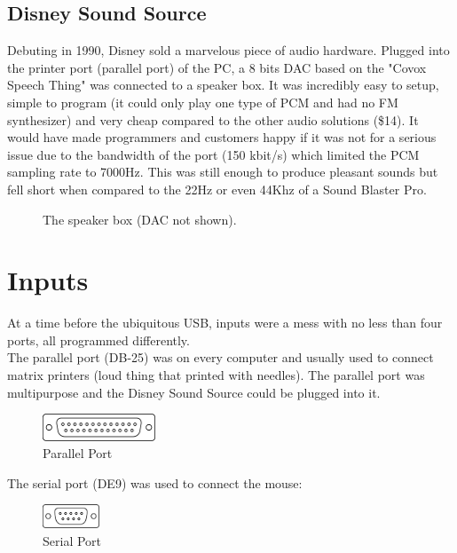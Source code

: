 \documentclass[book.tex]{subfiles}
\begin{document}
  \subsection{Disney Sound Source}
  Debuting in 1990, Disney sold a marvelous piece of audio hardware. Plugged into the printer port (parallel port) of the PC, a 8 bits DAC based on the "Covox Speech Thing" was connected to a speaker box. It was incredibly easy to setup, simple to program (it could only play one type of PCM and had no FM synthesizer) and very cheap compared to the other audio solutions (\$14). It would have made programmers and customers happy if it was not for a serious issue due to the bandwidth of the port (150 kbit/s) which limited the PCM sampling rate to 7000Hz.  This was still enough to produce pleasant sounds but fell short when compared to the 22Hz or even 44Khz of a Sound Blaster Pro.
  \par
  \begin{figure}[H] 
    \centering 
    \caption{The speaker box (DAC not shown).}
  \end{figure}








\section{Inputs}
At a time before the ubiquitous USB, inputs were a mess with no less than four ports, all programmed differently.\\

The parallel port (DB-25) was on every computer and usually used to connect matrix printers (loud thing that printed with needles). The parallel port was multipurpose and the Disney Sound Source could be plugged into it.\\
\par
 \begin{figure}[H]
\centering
\includegraphics[width=0.3\textwidth]{imgs/drawings/ports/DB-25_parallel_port.eps}
\caption{Parallel Port}
\label{fig:parallelPort}
\end{figure}


The serial port (DE9) was used to connect the mouse:
 \begin{figure}[H]
\centering
\includegraphics[width=0.15\textwidth]{imgs/drawings/ports/DE9_serial_port.eps}
\caption{Serial Port}
\label{fig:serialPort}
\end{figure}
\end{document}
